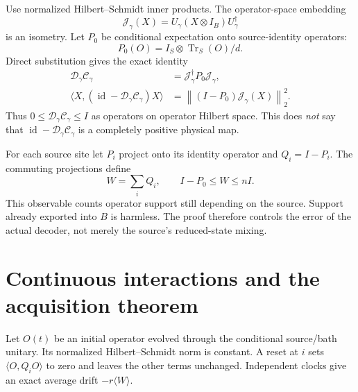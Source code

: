 \documentclass[11pt,a4paper]{article}
\newcommand{\id}{\operatorname{id}}\newcommand{\Tr}{\operatorname{Tr}}\newcommand{\osc}{\operatorname{osc}}
\newcommand{\norm}[1]{\left\lVert #1\right\rVert}\newcommand{\ket}[1]{\lvert #1\rangle}\newcommand{\bra}[1]{\langle #1\rvert}
\newcommand{\cC}{\mathcal C}\newcommand{\cD}{\mathcal D}\newcommand{\cR}{\mathcal R}\newcommand{\cV}{\mathcal V}\newcommand{\cJ}{\mathcal J}
\begin{document}
Use normalized Hilbert--Schmidt inner products. The operator-space embedding
\begin{equation}
\cJ_\gamma(X)=U_\gamma(X\otimes I_B)U_\gamma^\dagger
\end{equation}
is an isometry. Let $P_0$ be conditional expectation onto source-identity operators:
\begin{equation}
P_0(O)=I_S\otimes\Tr_S(O)/d.
\end{equation}
Direct substitution gives the exact identity
\begin{equation}
\boxed{\begin{aligned}
\cD_\gamma\cC_\gamma&=\cJ_\gamma^\dagger P_0\cJ_\gamma,\\
\langle X,(\id-\cD_\gamma\cC_\gamma)X\rangle
&=\norm{(I-P_0)\cJ_\gamma(X)}_2^2.
\end{aligned}}
\label{eq:projection}
\end{equation}
Thus $0\le\cD_\gamma\cC_\gamma\le I$ as operators on operator Hilbert space. This does \emph{not} say that $\id-\cD_\gamma\cC_\gamma$ is a completely positive physical map.

For each source site let $P_i$ project onto its identity operator and $Q_i=I-P_i$. The commuting projections define
\begin{equation}
W=\sum_iQ_i,\qquad I-P_0\le W\le nI.
\end{equation}
This observable counts operator support still depending on the source. Support already exported into $B$ is harmless. The proof therefore controls the error of the actual decoder, not merely the source's reduced-state mixing.

\section{Continuous interactions and the acquisition theorem}

Let $O(t)$ be an initial operator evolved through the conditional source/bath unitary. Its normalized Hilbert--Schmidt norm is constant. A reset at $i$ sets $\langle O,Q_iO\rangle$ to zero and leaves the other terms unchanged. Independent clocks give an exact average drift $-r\langle W\rangle$.
\end{document}
